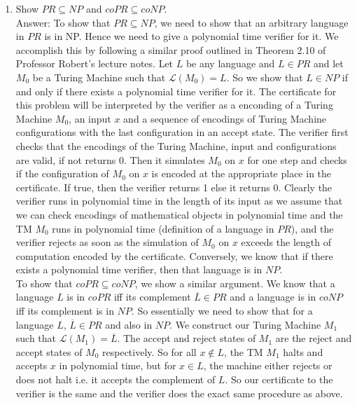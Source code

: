 \documentclass{csc_assignment}
\begin{document}
\begin{description}
\begin{enumerate}

  \item Show $PR \subseteq NP$ and $coPR \subseteq coNP$. \\
  Answer: To show that $PR \subseteq NP$, we need to show that an arbitrary language in $PR$ is in NP. Hence we need to give a polynomial time verifier for it. We accomplish this by following a similar proof outlined in Theorem 2.10 of Professor Robert's lecture notes. Let $L$ be any language and $L \in PR$ and let $M_{0}$ be a Turing Machine such that $\mathcal{L}(M_{0}) = L$. So we show that $L \in NP$ if and only if there exists a polynomial time verifier for it. The certificate for this problem will be interpreted by the verifier as a enconding of a Turing Machine $M_{0}$, an input $x$ and a sequence of encodings of Turing Machine configurations with the last configuration in an accept state. The verifier first checks that the encodings of the Turing Machine, input and configurations are valid, if not returns 0. Then it simulates $M_{0}$ on $x$ for one step and checks if the configuration of $M_{0}$ on $x$ is encoded at the appropriate place in the certificate. If true, then the verifier returns 1 else it returns 0. Clearly the verifier runs in polynomial time in the length of its input as we assume that we can check encodings of mathematical objects in polynomial time and the TM $M_{0}$ runs in polynomial time (definition of a language in $PR$), and the verifier rejects as soon as the simulation of $M_{0}$ on $x$ exceeds the length of computation encoded by the certificate. Conversely, we know that if there exists a polynomial time verifier, then that language is in $NP$. \\ To show that $coPR \subseteq coNP$, we show a similar argument. We know that a language $L$ is in $coPR$ iff its complement $\overline L \in PR$ and a language is in $coNP$ iff its complement is in $NP$. So essentially we need to show that for a language $L$, $\overline L \in PR$ and also in $NP$. We construct our Turing Machine $M_{1}$ such that $\mathcal{L}(M_{1}) = \overline L$. The accept and reject states of $M_{1}$ are the reject and accept states of $M_{0}$ respectively. So for all $x \notin L$, the TM $M_{1}$ halts and accepts $x$ in polynomial time, but for $x \in L$, the machine either rejects or does not halt i.e. it accepts the complement of $L$. So our certificate to the verifier is the same and the verifier does the exact same procedure as above. 
  

\end{enumerate}
\end{description}
\end{document}
